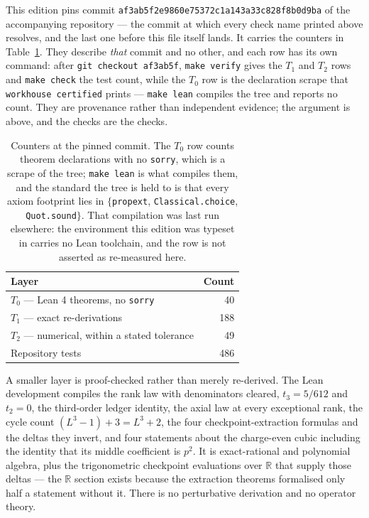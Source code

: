 \documentclass[10pt,twocolumn]{article}
\theoremstyle{plain}
\theoremstyle{definition}
\theoremstyle{remark}
\begin{document}
This edition pins commit
\texttt{af3ab5f2e9860e75372c1a143a33c828f8b0d9ba} of the accompanying
repository --- the commit at which every check name printed above resolves,
and the last one before this file itself lands. It carries the counters in
Table~\ref{tab:counters}. They describe \emph{that} commit and no other, and
each row has its own command: after
\texttt{git checkout af3ab5f}, \texttt{make verify} gives the $T_1$ and $T_2$
rows and \texttt{make check} the test count, while the $T_0$ row is the
declaration scrape that \texttt{workhouse certified} prints ---
\texttt{make lean} compiles the tree and reports no count.
They are provenance rather than independent evidence; the argument is above, and the checks are the checks.

\begin{table}[t]
\centering
\begin{tabular}{@{}lr@{}}
\toprule
Layer & Count \\
\midrule
$T_0$ — Lean 4 theorems, no \texttt{sorry} & 40 \\
$T_1$ — exact re-derivations & 188 \\
$T_2$ — numerical, within a stated tolerance & 49 \\
Repository tests & 486 \\
\bottomrule
\end{tabular}
\caption{Counters at the pinned commit. The $T_0$ row counts theorem
declarations with no \texttt{sorry}, which is a scrape of the tree;
\texttt{make lean} is what compiles them, and the standard the tree is held to
is that every axiom footprint lies in $\{$\texttt{propext},
\texttt{Classical.choice}, \texttt{Quot.sound}$\}$. That compilation was last
run elsewhere: the environment this edition was typeset in carries no Lean
toolchain, and the row is not asserted as re-measured here.}
\label{tab:counters}
\end{table}

A smaller layer is proof-checked rather than merely re-derived. The Lean
development compiles the rank law with denominators cleared, $t_3=5/612$ and
$t_2=0$, the third-order ledger identity, the axial law at every exceptional
rank, the cycle count $(L^3-1)+3=L^3+2$, the four checkpoint-extraction
formulas and the deltas they invert, and four statements about the charge-even
cubic including the identity that its middle coefficient is $p^2$. It is
exact-rational and polynomial algebra, plus the trigonometric checkpoint
evaluations over $\mathbb R$ that supply those deltas --- the $\mathbb R$
section exists because the extraction theorems formalised only half a statement
without it. There is no perturbative derivation and no operator theory.
\end{document}
